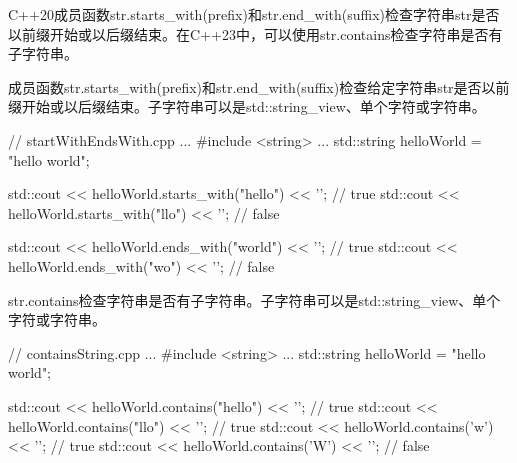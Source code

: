 C++20成员函数str.starts\_with(prefix)和str.end\_with(suffix)检查字符串str是否以前缀开始或以后缀结束。在C++23中，可以使用str.contains检查字符串是否有子字符串。


成员函数str.starts\_with(prefix)和str.end\_with(suffix)检查给定字符串str是否以前缀开始或以后缀结束。子字符串可以是std::string\_view、单个字符或字符串。


\begin{cpp}
// startWithEndsWith.cpp
...
#include <string>
...
std::string helloWorld = "hello world";

std::cout << helloWorld.starts_with("hello") << '\n'; // true
std::cout << helloWorld.starts_with("llo") << '\n'; // false

std::cout << helloWorld.ends_with("world") << '\n'; // true
std::cout << helloWorld.ends_with("wo") << '\n'; // false
\end{cpp}


str.contains检查字符串是否有子字符串。子字符串可以是std::string\_view、单个字符或字符串。


\begin{cpp}
// containsString.cpp
...
#include <string>
...
std::string helloWorld = "hello world";

std::cout << helloWorld.contains("hello") << '\n'; // true
std::cout << helloWorld.contains("llo") << '\n'; // true
std::cout << helloWorld.contains('w') << '\n'; // true
std::cout << helloWorld.contains('W') << '\n'; // false
\end{cpp}

































